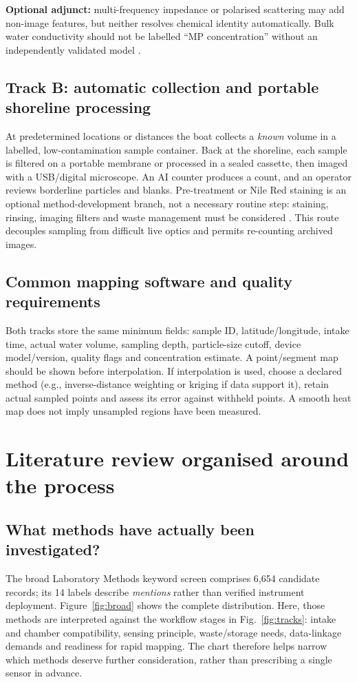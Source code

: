 \documentclass[10pt,a4paper]{article}
\begin{document}
\textbf{Optional adjunct:} multi-frequency impedance or polarised scattering may add non-image features, but neither resolves chemical identity automatically. Bulk water conductivity should not be labelled ``MP concentration'' without an independently validated model \cite{Blevins2021,Kim2024,Warraich2025,Polarized2021}.

\subsection{Track B: automatic collection and portable shoreline processing}
At predetermined locations or distances the boat collects a \emph{known} volume in a labelled, low-contamination sample container. Back at the shoreline, each sample is filtered on a portable membrane or processed in a sealed cassette, then imaged with a USB/digital microscope. An AI counter produces a count, and an operator reviews borderline particles and blanks. Pre-treatment or Nile Red staining is an optional method-development branch, not a necessary routine step: staining, rinsing, imaging filters and waste management must be considered \cite{ErniCassola2017,Minor2023,Zhang2023,Lee2022}. This route decouples sampling from difficult live optics and permits re-counting archived images.

\subsection{Common mapping software and quality requirements}
Both tracks store the same minimum fields: sample ID, latitude/longitude, intake time, actual water volume, sampling depth, particle-size cutoff, device model/version, quality flags and concentration estimate. A point/segment map should be shown before interpolation. If interpolation is used, choose a declared method (e.g., inverse-distance weighting or kriging if data support it), retain actual sampled points and assess its error against withheld points. A smooth heat map does not imply unsampled regions have been measured.

\section{Literature review organised around the process}
\subsection{What methods have actually been investigated?}
The broad Laboratory Methods keyword screen comprises 6,654 candidate records; its 14 labels describe \emph{mentions} rather than verified instrument deployment. Figure~\ref{fig:broad} shows the complete distribution. Here, those methods are interpreted against the workflow stages in Fig.~\ref{fig:tracks}: intake and chamber compatibility, sensing principle, waste/storage needs, data-linkage demands and readiness for rapid mapping. The chart therefore helps narrow which methods deserve further consideration, rather than prescribing a single sensor in advance.
\end{document}
